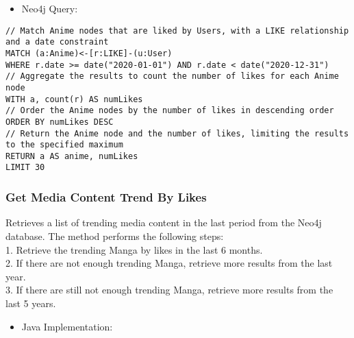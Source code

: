 \begin{itemize}
    \item Neo4j Query:
\end{itemize}

\begin{mdframed}[style=customstyle2]
\begin{lstlisting}[language=Cypher, backgroundcolor=\color{white}]
// Match Anime nodes that are liked by Users, with a LIKE relationship and a date constraint
MATCH (a:Anime)<-[r:LIKE]-(u:User)
WHERE r.date >= date("2020-01-01") AND r.date < date("2020-12-31")
// Aggregate the results to count the number of likes for each Anime node
WITH a, count(r) AS numLikes
// Order the Anime nodes by the number of likes in descending order
ORDER BY numLikes DESC
// Return the Anime node and the number of likes, limiting the results to the specified maximum
RETURN a AS anime, numLikes
LIMIT 30\end{lstlisting}
\end{mdframed}

\subsubsection*{Get Media Content Trend By Likes}

Retrieves a list of trending media content in the last period from the Neo4j database.
The method performs the following steps:\\
1. Retrieve the trending Manga by likes in the last 6 months.\\
2. If there are not enough trending Manga, retrieve more results from the last year.\\
3. If there are still not enough trending Manga, retrieve more results from the last 5 years.\\
\begin{itemize}
    \item Java Implementation:
\end{itemize}

